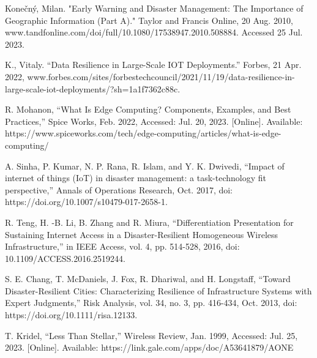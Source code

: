 \documentclass[conference]{IEEEtran}
\begin{document}
\begin{thebibliography}{00}
     Konečný, Milan. "Early Warning and Disaster Management: The Importance of Geographic  
        Information (Part A)." Taylor and Francis Online, 20 Aug. 2010, 
        www.tandfonline.com/doi/full/10.1080/17538947.2010.508884. Accessed 25 Jul. 2023.


     K., Vitaly. ``Data Resilience in Large-Scale IOT Deployments.'' Forbes, 21 Apr. 2022, 
        www.forbes.com/sites/forbestechcouncil/2021/11/19/data-resilience-in-large-scale-iot-deployments/?sh=1a1f7362c88c. 
	
     R. Mohanon, ``What Is Edge Computing? Components, Examples, and Best Practices,''
        Spice Works, Feb. 2022, Accessed: Jul. 20, 2023. [Online]. 
        Available: https://www.spiceworks.com/tech/edge-computing/articles/what-is-edge-computing/
    
     A. Sinha, P. Kumar, N. P. Rana, R. Islam, and Y. K. Dwivedi, 
        ``Impact of internet of things (IoT) in disaster management: a task-technology fit perspective,''
        Annals of Operations Research, Oct. 2017, doi: https://doi.org/10.1007/s10479-017-2658-1.

     R. Teng, H. -B. Li, B. Zhang and R. Miura, ``Differentiation Presentation for 
        Sustaining Internet Access in a Disaster-Resilient Homogeneous Wireless Infrastructure,'' in 
        IEEE Access, vol. 4, pp. 514-528, 2016, doi: 10.1109/ACCESS.2016.2519244.
    
     S. E. Chang, T. McDaniels, J. Fox, R. Dhariwal, and H. Longstaff, 
        ``Toward Disaster-Resilient Cities: Characterizing Resilience of Infrastructure Systems with 
        Expert Judgments,'' Risk Analysis, vol. 34, no. 3, pp. 416-434, Oct. 2013, 
        doi: https://doi.org/10.1111/risa.12133.

        T. Kridel, ``Less Than Stellar,'' Wireless Review, Jan. 1999, Accessed: Jul. 25, 2023. [Online]. 
        Available: https://link.gale.com/apps/doc/A53641879/AONE
\end{thebibliography}
    \vspace{12pt}
\end{document}
